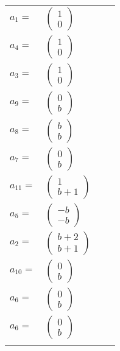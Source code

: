 \documentclass[1p]{elsarticle_modified}
\theoremstyle{definition}
\begin{document}
\begin{tabular}{m{7pt} m{180pt} m{7pt} m{180pt} }
\flushright $a_{1}=$&$\begin{pmatrix}1\\0\end{pmatrix}$ \\
\flushright $a_{4}=$&$\begin{pmatrix}1\\0\end{pmatrix}$ \\
\flushright $a_{3}=$&$\begin{pmatrix}1\\0\end{pmatrix}$ \\
\flushright $a_{9}=$&$\begin{pmatrix}0\\b\end{pmatrix}$ \\
\flushright $a_{8}=$&$\begin{pmatrix}b\\b\end{pmatrix}$ \\
\flushright $a_{7}=$&$\begin{pmatrix}0\\b\end{pmatrix}$ \\
\flushright $a_{11}=$&$\begin{pmatrix}1\\b+1\end{pmatrix}$ \\
\flushright $a_{5}=$&$\begin{pmatrix}- b\\- b\end{pmatrix}$ \\
\flushright $a_{2}=$&$\begin{pmatrix}b+2\\b+1\end{pmatrix}$ \\
\flushright $a_{10}=$&$\begin{pmatrix}0\\b\end{pmatrix}$ \\
\flushright $a_{6}=$&$\begin{pmatrix}0\\b\end{pmatrix}$\\ \flushright $a_{6}=$&$\begin{pmatrix}0\\b\end{pmatrix}$\\&\end{tabular}
\end{document}
